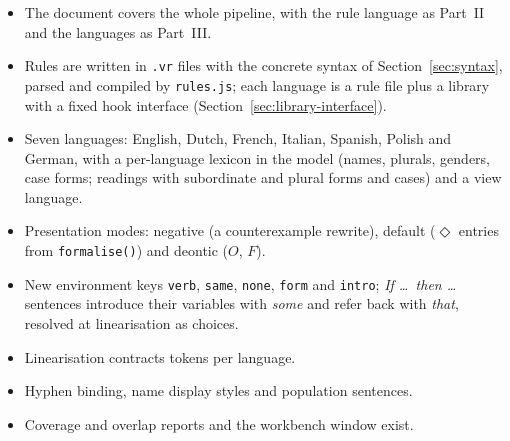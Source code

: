\documentclass[11pt, a4paper]{article}
\newcommand{\code}[1]{\texttt{\color{codefg}#1}}
\begin{document}
\begin{itemize}
  \item The document covers the whole pipeline, with the rule language as
        Part~II and the languages as Part~III.
  \item Rules are written in \code{.vr} files with the concrete syntax of
        Section~\ref{sec:syntax}, parsed and compiled by \code{rules.js};
        each language is a rule file plus a library with a fixed hook
        interface (Section~\ref{sec:library-interface}).
  \item Seven languages: English, Dutch, French, Italian, Spanish, Polish and
        German, with a per-language lexicon in the model (names, plurals,
        genders, case forms; readings with subordinate and plural forms and
        cases) and a view language.
  \item Presentation modes: negative (a counterexample rewrite), default
        ($\Diamond$ entries from \code{formalise()}) and deontic
        ($O$, $F$).
  \item New environment keys \code{verb}, \code{same}, \code{none},
        \code{form} and \code{intro}; \textit{If \ldots\ then \ldots}
        sentences introduce their variables with \textit{some} and refer
        back with \textit{that}, resolved at linearisation as choices.
  \item Linearisation contracts tokens per language.
  \item Hyphen binding, name display styles and population sentences.
  \item Coverage and overlap reports and the workbench window exist.
\end{itemize}
\end{document}
